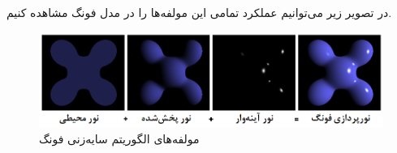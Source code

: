 در تصویر زیر می‌توانیم عملکرد تمامی این مولفه‌ها را در مدل فونگ مشاهده کنیم.

\begin{figure}[ht]
	\centerline{\includegraphics[width=\textwidth,height=\textheight,keepaspectratio]{Figures/Ch2/Phong_components.png}}

	\caption{مولفه‌های الگوریتم سایه‌زنی فونگ
    \cite{PhongShadingWikipedia}
    }
	\label{fig:PhongShadingWikipedia}
\end{figure}
